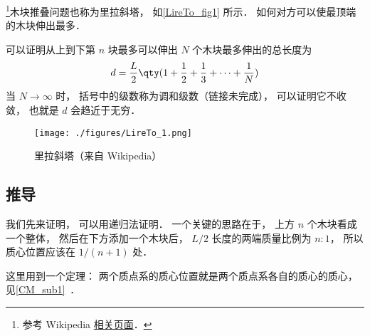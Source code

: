 
\begin{issues}
\issueDraft
\end{issues}


\footnote{参考 Wikipedia \href{https://en.wikipedia.org/wiki/Block-stacking_problem}{相关页面}．}木块推叠问题也称为里拉斜塔， 如\autoref{LireTo_fig1} 所示． 如何对方可以使最顶端的木块伸出最多．

可以证明从上到下第 $n$ 块最多可以伸出  $N$ 个木块最多伸出的总长度为
\begin{equation}
d = \frac{L}{2}\qty(1 + \frac{1}{2} + \frac{1}{3} + \dots + \frac{1}{N})
\end{equation}
当 $N\to\infty$ 时， 括号中的级数称为调和级数（链接未完成）， 可以证明它不收敛， 也就是 $d$ 会趋近于无穷．

\begin{figure}[ht]
\centering
\texttt{[image: ./figures/LireTo\_1.png]}
\caption{里拉斜塔（来自 Wikipedia）} \label{LireTo_fig1}
\end{figure}

\subsection{推导}
我们先来证明，   可以用递归法证明．  一个关键的思路在于， 上方 $n$ 个木块看成一个整体， 然后在下方添加一个木块后， $L/2$ 长度的两端质量比例为 $n:1$， 所以质心位置应该在 $1/(n+1)$ 处．

这里用到一个定理： 两个质点系的质心位置就是两个质点系各自的质心的质心， 见\autoref{CM_sub1}~．



